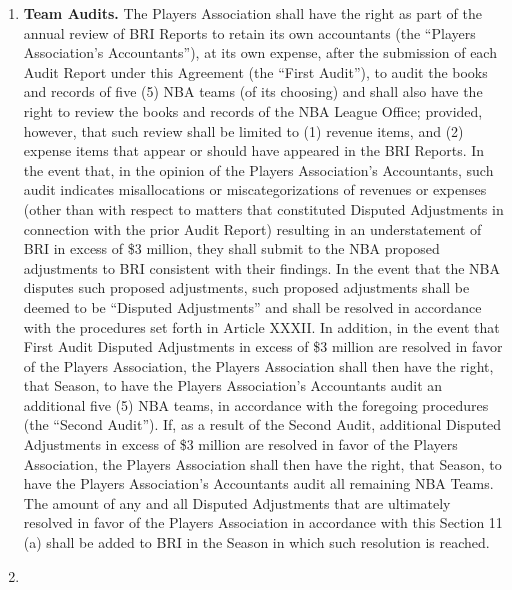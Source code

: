 \documentclass[
]{book}
\providecommand{\tightlist}{%
  \setlength{\itemsep}{0pt}\setlength{\parskip}{0pt}}
\begin{document}
\begin{enumerate}
\def\labelenumi{(\alph{enumi})}
\tightlist
\item
  \textbf{Team Audits.} The Players Association shall have the right as part of the annual review of BRI Reports to retain its own accountants (the ``Players Association's Accountants''), at its own expense, after the submission of each Audit Report under this Agreement (the ``First Audit''), to audit the books and records of five (5) NBA teams (of its choosing) and shall also have the right to review the books and records of the NBA League Office; provided, however, that such review shall be limited to (1) revenue items, and (2) expense items that appear or should have appeared in the BRI Reports. In the event that, in the opinion of the Players Association's Accountants, such audit indicates misallocations or miscategorizations of revenues or expenses (other than with respect to matters that constituted Disputed Adjustments in connection with the prior Audit Report) resulting in an understatement of BRI in excess of \$3 million, they shall submit to the NBA proposed adjustments to BRI consistent with their findings. In the event that the NBA disputes such proposed adjustments, such proposed adjustments shall be deemed to be ``Disputed Adjustments'' and shall be resolved in accordance with the procedures set forth in Article XXXII. In addition, in the event that First Audit Disputed Adjustments in excess of \$3 million are resolved in favor of the Players Association, the Players Association shall then have the right, that Season, to have the Players Association's Accountants audit an additional five (5) NBA teams, in accordance with the foregoing procedures (the ``Second Audit''). If, as a result of the Second Audit, additional Disputed Adjustments in excess of \$3 million are resolved in favor of the Players Association, the Players Association shall then have the right, that Season, to have the Players Association's Accountants audit all remaining NBA Teams. The amount of any and all Disputed Adjustments that are ultimately resolved in favor of the Players Association in accordance with this Section 11 (a) shall be added to BRI in the Season in which such resolution is reached.
\item

\end{enumerate}
\end{document}
